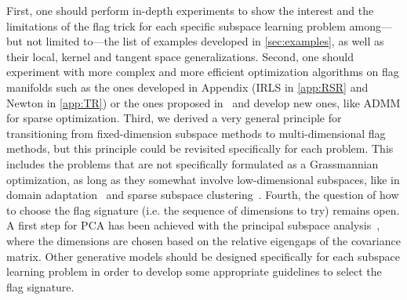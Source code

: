 First, one should perform in-depth experiments to show the interest and the limitations of the flag trick for each specific subspace learning problem among---but not limited to---the list of examples developed in \autoref{sec:examples}, as well as their local, kernel and tangent space generalizations. 
Second, one should experiment with more complex and more efficient optimization algorithms on flag manifolds such as the ones developed in Appendix (IRLS in \autoref{app:RSR} and Newton in \autoref{app:TR}) or the ones proposed in~\citet{ye_optimization_2022,zhu_practical_2024} and develop new ones, like ADMM for sparse optimization.
Third, we derived a very general principle for transitioning from fixed-dimension subspace methods to multi-dimensional flag methods, but this principle could be revisited specifically for each problem. This includes the problems that are not specifically formulated as a Grassmannian optimization, as long as they somewhat involve low-dimensional subspaces, like in domain adaptation~\citep{gopalan_domain_2011, boqing_gong_geodesic_2012} and sparse subspace clustering~\citep{elhamifar_sparse_2013}.
Fourth, the question of how to choose the flag signature (i.e. the sequence of dimensions to try) remains open.
A first step for PCA has been achieved with the principal subspace analysis~\citep{szwagier_curse_2024}, where the dimensions are chosen based on the relative eigengaps of the covariance matrix. Other generative models should be designed specifically for each subspace learning problem in order to develop some appropriate guidelines to select the flag signature.
